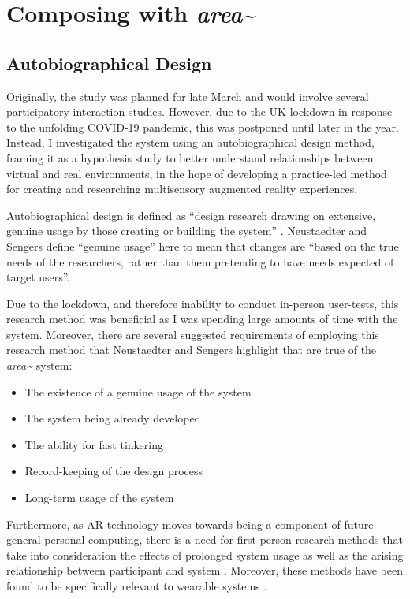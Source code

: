 \section{Composing with \textit{area\textasciitilde{}}} \label{sec: area-study}
\subsection{Autobiographical Design}            \label{sec: area-study-abd}
Originally, the study was planned for late March and would involve several participatory interaction studies. However, due to the UK lockdown in response to the unfolding COVID-19 pandemic, this was postponed until later in the year. Instead, I investigated the system using an autobiographical design method, framing it as a hypothesis study to better understand relationships between virtual and real environments, in the hope of developing a practice-led method for creating and researching multisensory augmented reality experiences. 

Autobiographical design is defined as “design research drawing on extensive, genuine usage by those creating or building the system” \citep{neustaedter2012}. Neustaedter and Sengers define “genuine usage” here to mean that changes are “based on the true needs of the researchers, rather than them pretending to have needs expected of target users”.

Due to the lockdown, and therefore inability to conduct in-person user-tests, this research method was beneficial as I was spending large amounts of time with the system. Moreover, there are several suggested requirements of employing this research method that Neustaedter and Sengers highlight that are true of the \textit{area\textasciitilde{}} system:
\begin{itemize}
    \item The existence of a genuine usage of the system
    \item The system being already developed
    \item The ability for fast tinkering 
    \item Record-keeping of the design process
    \item Long-term usage of the system
\end{itemize}
Furthermore, as AR technology moves towards being a component of future general personal computing, there is a need for first-person research methods that take into consideration the effects of prolonged system usage as well as the arising relationship between participant and system \citep{desjardins2018}. Moreover, these methods have been found to be specifically relevant to wearable systems \citep{cecchinato2017}.

